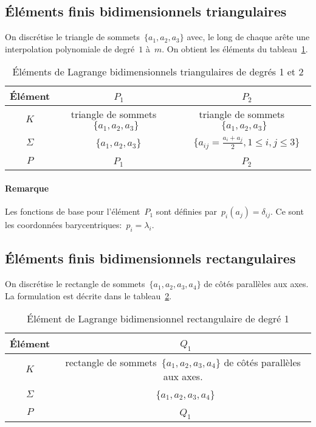 \medskip
\subsection*{Éléments finis bidimensionnels triangulaires}
On discrétise le triangle de sommets~$\{a_1, a_2, a_3\}$ avec, le long de chaque arête une interpolation polynomiale de degré~$1$ à~$m$.
On obtient les éléments du tableau~\ref{tab:Elem:bi}.
\begin{table}[ht]\centering\small
\begin{tabular}{c|cc}
Élément &~$P_1$ &~$P_2$ \\
\hline
$K$	  & triangle de sommets~$\{a_1, a_2, a_3\}$ & triangle de sommets~$\{a_1, a_2, a_3\}$\\
$\Sigma$ &~$\{a_1, a_2, a_3\}$ &~$\{a_{ij}=\frac{a_i+a_j}2, 1\le i,j\le 3\}$ \\
$P$   &~$P_1$ &~$P_2$ \\
\hline
\end{tabular}
\caption{Éléments de Lagrange bidimensionnels triangulaires de degrés 1 et 2}\label{tab:Elem:bi}
\end{table}

\paragraph{Remarque}Les fonctions de base pour l'élément~$P_1$ sont définies par~$p_i(a_j) = \delta_{ij}$. Ce sont les coordonnées barycentriques:~$p_i = \lambda_i$.

\medskip
\subsection*{Éléments finis bidimensionnels rectangulaires}
On discrétise le rectangle de sommets~$\{a_1, a_2, a_3, a_4\}$ de côtés parallèles aux axes. La formulation est décrite dans le tableau~\ref{tab:Elem:bibi}.
\begin{table}[ht]\centering\small
\begin{tabular}{c|c}
Élément &~$Q_1$\\
\hline
$K$ & rectangle de sommets~$\{a_1, a_2, a_3, a_4\}$ de côtés parallèles aux axes.\\
$\Sigma$ &~$\{a_1, a_2, a_3, a_4\}$\\
$P$ &~$Q_1$\\
\hline
\end{tabular}
\caption{Élément de Lagrange bidimensionnel rectangulaire de degré 1}\label{tab:Elem:bibi}
\end{table}

